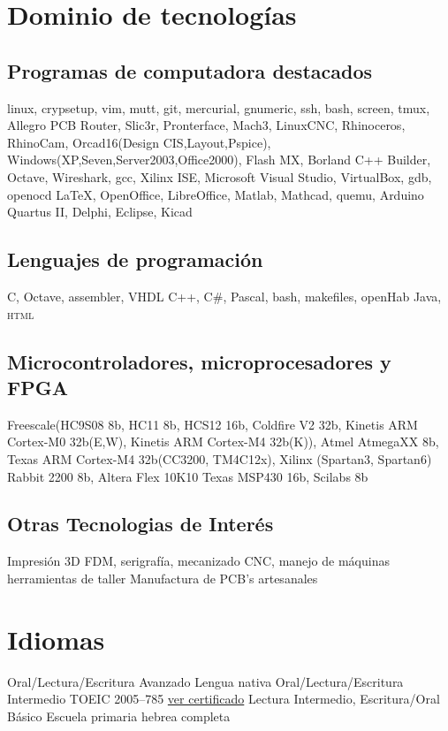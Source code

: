 \documentclass[11pt,a4paper,sans]{moderncv} 	%
\begin{document}
\section{Dominio de tecnologías}
	\subsection{Programas de computadora destacados}
	 	{linux, crypsetup, vim, mutt, git, mercurial, gnumeric, ssh, bash, screen, tmux, Allegro PCB Router, Slic3r, Pronterface, Mach3, LinuxCNC, Rhinoceros, RhinoCam, Orcad16(Design CIS,Layout,Pspice), Windows(XP,Seven,Server2003,Office2000), Flash MX, Borland C++ Builder, Octave, Wireshark, gcc, Xilinx ISE, Microsoft Visual Studio, VirtualBox, gdb, openocd}
	 	{\LaTeX, OpenOffice, LibreOffice, Matlab, Mathcad, quemu, Arduino}
	 	{Quartus II, Delphi, Eclipse, Kicad}

	\subsection{Lenguajes de programación}
	 	{C, Octave, assembler, VHDL}
	 	{C++, C\#, Pascal, bash, makefiles, openHab}
	 	{Java, \textsc{html}}

	\subsection{Microcontroladores, microprocesadores y FPGA}
	 	{Freescale(HC9S08 8b, HC11 8b, HCS12 16b, Coldfire V2 32b, Kinetis ARM Cortex-M0 32b(E,W), Kinetis ARM Cortex-M4 32b(K)), Atmel AtmegaXX 8b, Texas ARM Cortex-M4 32b(CC3200, TM4C12x), Xilinx (Spartan3, Spartan6)}
	 	{Rabbit 2200 8b, Altera Flex 10K10}
	 	{Texas MSP430 16b, Scilabs 8b}
	
	\subsection{Otras Tecnologias de Interés}
	 	{Impresión 3D FDM, serigrafía, mecanizado CNC, manejo de máquinas herramientas de taller}
	 	{Manufactura de PCB's artesanales}
	 	{}

\section{Idiomas}
 	{Oral/Lectura/Escritura Avanzado} 		{Lengua nativa}
 	{Oral/Lectura/Escritura Intermedio} 		{TOEIC 2005--785 \href{http://disenioconingenio.com.ar/producto.php?products_id=390}{ver certificado}}
 	{Lectura Intermedio, Escritura/Oral Básico} 	{Escuela primaria hebrea completa}
\end{document}
